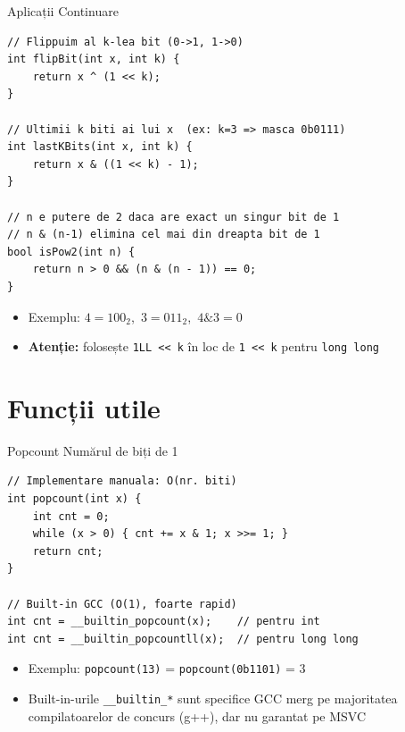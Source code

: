 ﻿\documentclass{beamer}
\begin{document}
\begin{frame}{Aplicații \textemdash{} Continuare}
  \begin{lstlisting}
// Flippuim al k-lea bit (0->1, 1->0)
int flipBit(int x, int k) {
    return x ^ (1 << k);
}

// Ultimii k biti ai lui x  (ex: k=3 => masca 0b0111)
int lastKBits(int x, int k) {
    return x & ((1 << k) - 1);
}

// n e putere de 2 daca are exact un singur bit de 1
// n & (n-1) elimina cel mai din dreapta bit de 1
bool isPow2(int n) {
    return n > 0 && (n & (n - 1)) == 0;
}
  \end{lstlisting}
  \begin{itemize}
    \item Exemplu: $4 = 100_2$,\ $3 = 011_2$,\ $4 \mathbin{\&} 3 = 0$ \checkmark
    \item \textbf{Atenție:} folosește \lstinline|1LL << k| în loc de \lstinline|1 << k| pentru \lstinline|long long|
  \end{itemize}
\end{frame}

\section{Funcții utile}

\begin{frame}{Popcount \textemdash{} Numărul de biți de 1}
  \begin{center}
  \begin{lstlisting}
// Implementare manuala: O(nr. biti)
int popcount(int x) {
    int cnt = 0;
    while (x > 0) { cnt += x & 1; x >>= 1; }
    return cnt;
}

// Built-in GCC (O(1), foarte rapid)
int cnt = __builtin_popcount(x);    // pentru int
int cnt = __builtin_popcountll(x);  // pentru long long
  \end{lstlisting}
  \end{center}
  \begin{itemize}
    \item Exemplu: \lstinline|popcount(13)| = \lstinline|popcount(0b1101)| = 3
    \item Built-in-urile \lstinline|__builtin_*| sunt specifice GCC \textemdash{} merg pe majoritatea compilatoarelor de concurs (g++), dar nu garantat pe MSVC
  \end{itemize}
\end{frame}
\end{document}
